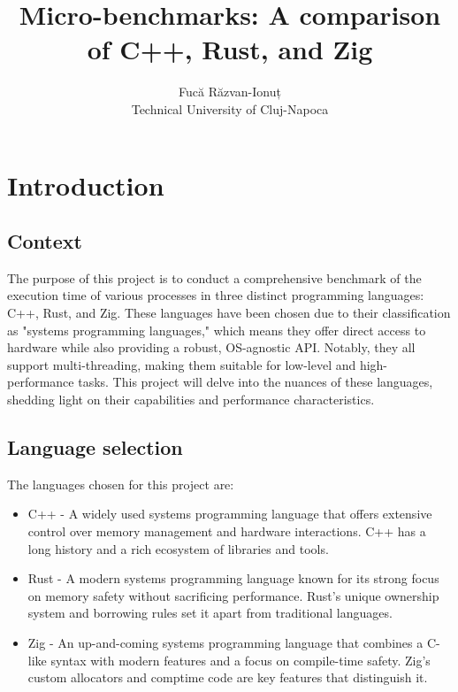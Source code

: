 \documentclass{article}
\title{Micro-benchmarks: A comparison of C++, Rust, and Zig}
\author{Fucă Răzvan-Ionuț \\ Technical University of Cluj-Napoca}
\date{}
\begin{document}
\maketitle
\vspace*{\fill}

\clearpage
\tableofcontents
\clearpage

\section{Introduction}
\subsection{Context}
The purpose of this project is to conduct a comprehensive benchmark of the execution time of various processes in three distinct programming languages: C++, Rust, and Zig. These languages have been chosen due to their classification as "systems programming languages," which means they offer direct access to hardware while also providing a robust, OS-agnostic API. Notably, they all support multi-threading, making them suitable for low-level and high-performance tasks. This project will delve into the nuances of these languages, shedding light on their capabilities and performance characteristics.

\subsection{Language selection}
The languages chosen for this project are:
\begin{itemize}
    \item C++ - A widely used systems programming language that offers extensive control over memory management and hardware interactions. C++ has a long history and a rich ecosystem of libraries and tools.
    \item Rust - A modern systems programming language known for its strong focus on memory safety without sacrificing performance. Rust's unique ownership system and borrowing rules set it apart from traditional languages.
    \item Zig - An up-and-coming systems programming language that combines a C-like syntax with modern features and a focus on compile-time safety. Zig's custom allocators and comptime code are key features that distinguish it.
\end{itemize}
\end{document}

